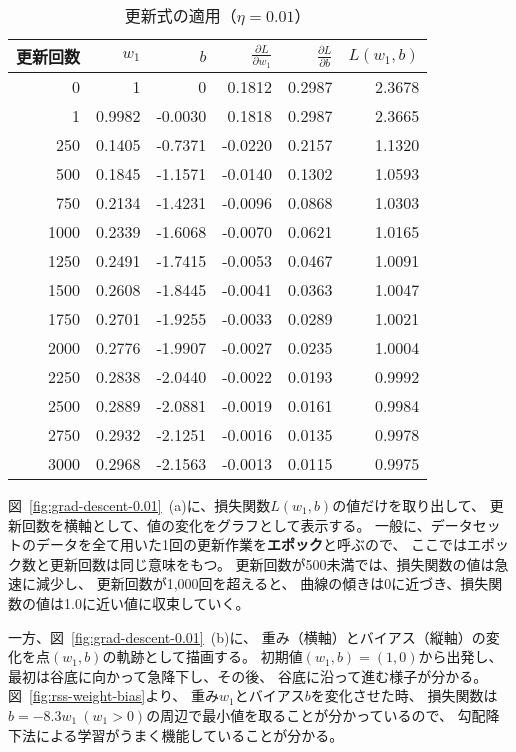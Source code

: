 \begin{table}
  \centering
  \begin{tabular}{r|rr|rr|r}
    \toprule
    更新回数 & $w_1$ & $b$ & $\frac{\partial L}{\partial w_1}$ & $\frac{\partial L}{\partial b}$ & $L(w_1, b)$ \\
    \midrule
    0 & 1 & 0 & 0.1812 & 0.2987 & 2.3678 \\
    1 & 0.9982 & -0.0030 & 0.1818 & 0.2987 & 2.3665 \\
    250 & 0.1405 & -0.7371 & -0.0220 & 0.2157 & 1.1320 \\
    500 & 0.1845 & -1.1571 & -0.0140 & 0.1302 & 1.0593 \\
    750 & 0.2134 & -1.4231 & -0.0096 & 0.0868 & 1.0303 \\
    1000 & 0.2339 & -1.6068 & -0.0070 & 0.0621 & 1.0165 \\
    1250 & 0.2491 & -1.7415 & -0.0053 & 0.0467 & 1.0091 \\
    1500 & 0.2608 & -1.8445 & -0.0041 & 0.0363 & 1.0047 \\
    1750 & 0.2701 & -1.9255 & -0.0033 & 0.0289 & 1.0021 \\
    2000 & 0.2776 & -1.9907 & -0.0027 & 0.0235 & 1.0004 \\
    2250 & 0.2838 & -2.0440 & -0.0022 & 0.0193 & 0.9992 \\
    2500 & 0.2889 & -2.0881 & -0.0019 & 0.0161 & 0.9984 \\
    2750 & 0.2932 & -2.1251 & -0.0016 & 0.0135 & 0.9978 \\
    3000 & 0.2968 & -2.1563 & -0.0013 & 0.0115 & 0.9975 \\
    \bottomrule
  \end{tabular}
  \caption{更新式の適用（$\eta = 0.01$）}
  \label{tab:update}
\end{table}

図~\ref{fig:grad-descent-0.01}~(a)に、損失関数$L(w_1, b)$の値だけを取り出して、
更新回数を横軸として、値の変化をグラフとして表示する。
一般に、データセットのデータを全て用いた1回の更新作業を\textbf{エポック}と呼ぶので、
ここではエポック数と更新回数は同じ意味をもつ。
更新回数が500未満では、損失関数の値は急速に減少し、
更新回数が1,000回を超えると、
曲線の傾きは0に近づき、損失関数の値は1.0に近い値に収束していく。

一方、図~\ref{fig:grad-descent-0.01}~(b)に、
重み（横軸）とバイアス（縦軸）の変化を点$(w_1, b)$の軌跡として描画する。
初期値$(w_1, b) = (1, 0)$から出発し、最初は谷底に向かって急降下し、その後、
谷底に沿って進む様子が分かる。
図~\ref{fig:rss-weight-bias}より、
重み$w_1$とバイアス$b$を変化させた時、
損失関数は$b = -8.3 w_1\ (w_1 > 0)$の周辺で最小値を取ることが分かっているので、
勾配降下法による学習がうまく機能していることが分かる。

